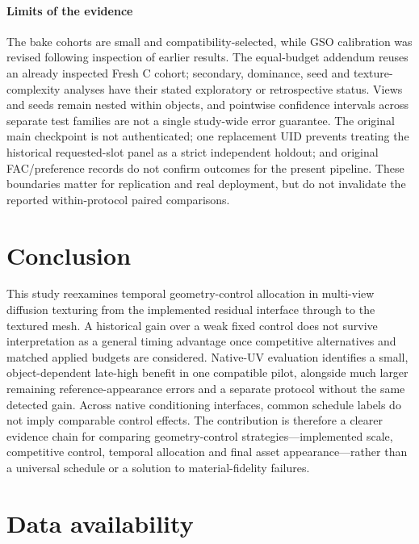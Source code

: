 \documentclass[times,twocolumn,final]{elsarticle}
\begin{document}
\paragraph{Limits of the evidence}
The bake cohorts are small and compatibility-selected, while GSO calibration was revised following inspection of earlier results. The equal-budget addendum reuses an already inspected Fresh C cohort; secondary, dominance, seed and texture-complexity analyses have their stated exploratory or retrospective status. Views and seeds remain nested within objects, and pointwise confidence intervals across separate test families are not a single study-wide error guarantee. The original main checkpoint is not authenticated; one replacement UID prevents treating the historical requested-slot panel as a strict independent holdout; and original FAC/preference records do not confirm outcomes for the present pipeline. These boundaries matter for replication and real deployment, but do not invalidate the reported within-protocol paired comparisons.



\section{Conclusion}
\label{sec:conclusion}

This study reexamines temporal geometry-control allocation in multi-view diffusion texturing from the implemented residual interface through to the textured mesh. A historical gain over a weak fixed control does not survive interpretation as a general timing advantage once competitive alternatives and matched applied budgets are considered. Native-UV evaluation identifies a small, object-dependent late-high benefit in one compatible pilot, alongside much larger remaining reference-appearance errors and a separate protocol without the same detected gain. Across native conditioning interfaces, common schedule labels do not imply comparable control effects. The contribution is therefore a clearer evidence chain for comparing geometry-control strategies---implemented scale, competitive control, temporal allocation and final asset appearance---rather than a universal schedule or a solution to material-fidelity failures.



\section*{Data availability}
\end{document}
